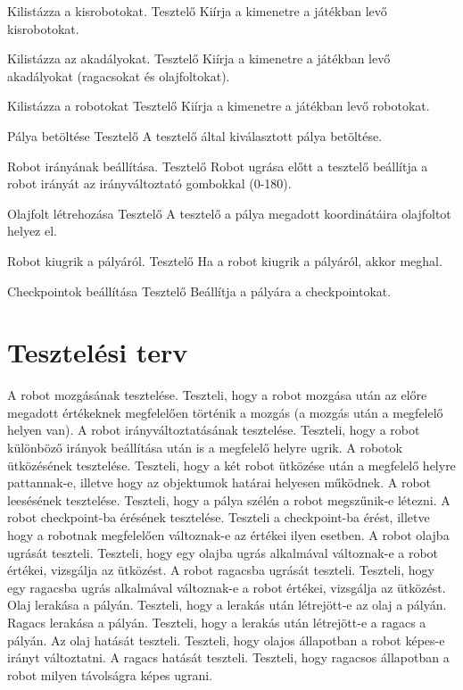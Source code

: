{Kilistázza a kisrobotokat.}
{Tesztelő}
{Kiírja a kimenetre a játékban levő kisrobotokat.}

{Kilistázza az akadályokat.}
{Tesztelő}
{Kiírja a kimenetre a játékban levő akadályokat (ragacsokat és olajfoltokat).}

{Kilistázza a robotokat}
{Tesztelő}
{Kiírja a kimenetre a játékban levő robotokat.}

{Pálya betöltése}
{Tesztelő}
{A tesztelő által kiválasztott pálya betöltése.}

{Robot irányának beállítása.}
{Tesztelő}
{Robot ugrása előtt a tesztelő beállítja a robot irányát az irányváltoztató gombokkal (0-180).}
\newpage

{Olajfolt létrehozása}
{Tesztelő}
{A tesztelő a pálya megadott koordinátáira olajfoltot helyez el.}

{Robot kiugrik a pályáról.}
{Tesztelő}
{Ha a robot kiugrik a pályáról, akkor meghal.}

{Checkpointok beállítása}
{Tesztelő}
{Beállítja a pályára a checkpointokat.}

\pagebreak
\section{Tesztelési terv}

	{A robot mozgásának tesztelése.}	{Teszteli, hogy a robot mozgása után az előre megadott értékeknek megfelelően történik a mozgás (a mozgás után a megfelelő helyen van).}
	{A robot irányváltoztatásának tesztelése.}	{Teszteli, hogy a robot különböző irányok beállítása után is a megfelelő helyre ugrik.}
	{A robotok ütközésének tesztelése.}	{Teszteli, hogy a két robot ütközése után a megfelelő helyre pattannak-e, illetve hogy az objektumok határai helyesen működnek.}
	{A robot leesésének tesztelése.}	{Teszteli, hogy a pálya szélén a robot megszűnik-e létezni.}
	{A robot checkpoint-ba érésének tesztelése.}	{Teszteli a checkpoint-ba érést, illetve hogy a robotnak megfelelően változnak-e az értékei ilyen esetben.}
	{A robot olajba ugrását teszteli.}	{Teszteli, hogy egy olajba ugrás alkalmával változnak-e a robot értékei, vizsgálja az ütközést.}
	{A robot ragacsba ugrását teszteli.}	{Teszteli, hogy egy ragacsba ugrás alkalmával változnak-e a robot értékei, vizsgálja az ütközést.}
	{Olaj lerakása a pályán.}	{Teszteli, hogy a lerakás után létrejött-e az olaj a pályán.}
	{Ragacs lerakása a pályán.}	{Teszteli, hogy a lerakás után létrejött-e a ragacs a pályán.}
	{Az olaj hatását teszteli.}	{Teszteli, hogy olajos állapotban a robot képes-e irányt változtatni.}
	{A ragacs hatását teszteli.}	{Teszteli, hogy ragacsos állapotban a robot milyen távolságra képes ugrani.}

